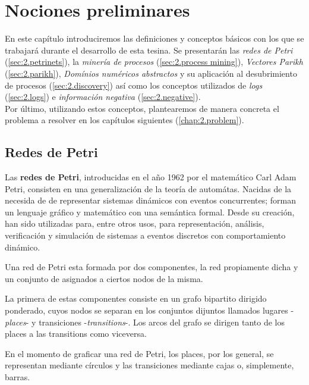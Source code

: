 \chapter[Nociones preliminares]{Nociones preliminares}
\label{chap:2}

En este capítulo introduciremos las definiciones y conceptos básicos con los que se trabajará durante el desarrollo de esta tesina. Se presentarán las \textit{redes de Petri} (\autoref{sec:2.petrinets}), la \textit{minería de procesos} (\autoref{sec:2.process mining}), \textit{Vectores Parikh} (\autoref{sec:2.parikh}),
\textit{Domínios numéricos abstractos} y su aplicación al desubrimiento de procesos (\autoref{sec:2.discovery}) así como los conceptos utilizados de \textit{logs} (\autoref{sec:2.logs}) e \textit{información negativa} (\autoref{sec:2.negative}).
\\

Por último, utilizando estos conceptos, plantearemos de manera concreta el problema a resolver en los capítulos siguientes (\autoref{chap:2.problem}).

\section{Redes de Petri}
\label{sec:2.petrinets}
Las \textbf{redes de Petri}, introducidas en el año 1962 por el matemático
Carl Adam Petri, consisten en una generalización de la teoría de automátas.
Nacidas de la necesida de de representar sistemas dinámicos con eventos concurrentes;
forman un lenguaje gráfico y matemático con una semántica formal.
Desde su creación, han sido utilizadas para, entre otros usos, para representación,
análisis, verificación y simulación de sistemas a eventos discretos con comportamiento dinámico\cite{Murata89}.

Una red de Petri esta formada por dos componentes, la red propiamente dicha y un conjunto
de  asignados a ciertos nodos de la misma.

La primera de estas componentes consiste en un grafo bipartito dirigido ponderado,
cuyos nodos se separan en los conjuntos dijuntos 
llamados lugares -\textit{places}- y transiciones -\textit{transitions}-.
Los arcos del grafo se dirigen tanto de los places a las transitions como viceversa.

En el momento de graficar una red de Petri, los places, por los general, se
representan mediante círculos y las transiciones mediante cajas o, simplemente, barras.

